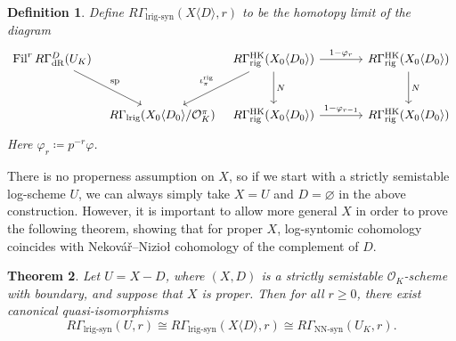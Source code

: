 \documentclass[cjm]{ipart}
\theoremstyle{plain}
\newtheorem{theorem}{Theorem}[subsection]
\newtheorem{definition}[theorem]{Definition}
\theoremstyle{remark}
\DeclareMathOperator{\Fil}{Fil}
\DeclareMathOperator{\HK}{HK}
\DeclareMathOperator{\lrigsyn}{lrig-syn}
\DeclareMathOperator{\lrig}{lrig}
\DeclareMathOperator{\NNsyn}{NN-syn}
\newcommand{\Nek}{Nekov\'a\v{r}\xspace}
\newcommand{\Niz}{Nizio\l\xspace}
\newcommand{\cO}{\mathcal{O}}
\newcommand{\dR}{\mathrm{dR}}
\newcommand{\rig}{\mathrm{rig}}
\numberwithin{equation}{subsection}
\renewcommand{\geq}{\geqslant}
\begin{document}
  \begin{definition}
   \label{def:lrigsyn}
   Define $R\Gamma_{\lrigsyn}\left(X\langle D\rangle, r\right)$ to be the homotopy limit of the diagram
   \[
    \begin{tikzcd}[row sep=large, column sep = tiny]
    \Fil^r R\Gamma_{\dR}^D(U_K)
      \arrow[dr, "{\operatorname{sp}}"]
    &
    {} &
    R\Gamma_{\rig}^{\HK}(X_0\langle D_0\rangle)
      \arrow[dl, "{\iota_\pi^{\rig}}"']
      \arrow[d, "N"]
      \arrow[rr, "{1-\varphi_r}"]
    &{\hspace{1.5em}}&
    R\Gamma_{\rig}^{\HK}(X_0\langle D_0\rangle)
      \arrow[d, "N"]
    \\
    {} &
    R\Gamma_{\lrig}(X_0\langle D_0 \rangle / \cO_K^\pi)
    &
    R\Gamma_{\rig}^{\HK}(X_0\langle D_0\rangle)
      \arrow[rr, "{1-\varphi_{r-1}}"]
    &&
    R\Gamma_{\rig}^{\HK}(X_0\langle D_0\rangle)
    \end{tikzcd}
   \]
   Here $\varphi_r \coloneqq p^{-r} \varphi$.
  \end{definition}

  \begin{note}
   There is no properness assumption on $X$, so if we start with a strictly semistable log-scheme $U$, we can always simply take $X = U$ and $D = \varnothing$ in the above construction. However, it is important to allow more general $X$ in order to prove the following theorem, showing that for proper $X$, log-syntomic cohomology coincides with \Nek--\Niz cohomology of the complement of $D$.
  \end{note}

  \begin{theorem}\label{thm:comparison}
   Let $U = X-D$, where $(X, D)$ is a strictly semistable $\cO_K$-scheme with boundary, and suppose that $X$ is proper. Then for all $r\geq 0$, there exist canonical quasi-isomorphisms
   \[ R\Gamma_{\lrigsyn}\left(U, r\right) \cong R\Gamma_{\lrigsyn}(X\langle D\rangle, r)\cong R\Gamma_{\NNsyn}(U_K,r).\]
  \end{theorem}
\end{document}
